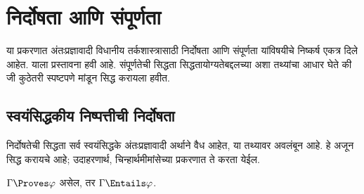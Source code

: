 \chapter{निर्दोषता आणि संपूर्णता}\label{int:sc:chap}
\begin{editorial}
  या प्रकरणात अंतःप्रज्ञावादी विधानीय तर्कशास्त्रासाठी
  निर्दोषता आणि संपूर्णता यांविषयीचे निष्कर्ष
  एकत्र दिले आहेत. याला प्रस्तावना हवी आहे.
  संपूर्णतेची सिद्धता सिद्धतायोग्यतेबद्दलच्या
  अशा तथ्यांचा आधार घेते की जी कुठेतरी
  स्पष्टपणे मांडून सिद्ध करायला हवीत.
\end{editorial}









\section{स्वयंसिद्धकीय निष्पत्तीची निर्दोषता}\label{int:sc:sax:sec}

\begin{editorial}
  निर्दोषतेची सिद्धता सर्व स्वयंसिद्धके
  अंतःप्रज्ञावादी अर्थाने वैध आहेत, या
  तथ्यावर अवलंबून आहे. हे अजून सिद्ध
  करायचे आहे; उदाहरणार्थ, चिन्हार्थमीमांसेच्या
  प्रकरणात ते करता येईल.
\end{editorial}

\begin{thm}[निर्दोषता]
  \label{int:sc:sax:thm:soundness}
  $\Gamma \Proves \varphi$ असेल, तर
  $ \Gamma \Entails \varphi$.
\end{thm}


